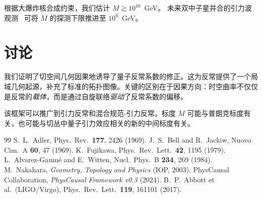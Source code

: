 \documentclass{article}
\begin{document}
根据大爆炸核合成约束，我们估计 $M \gtrsim 10^{10}$~GeV。
未来双中子星并合的引力波观测~\cite{abbott2017} 可将 $M$ 的探测下限推进至 $10^6$~GeV。

\section{讨论}

我们证明了切空间几何因果地诱导了量子反常系数的修正。这为反常提供了一个局域几何起源，补充了标准的拓扑图像。关键的区别在于因果方向：时空曲率不仅仅是反常的\emph{载体}，而是通过自旋联络\emph{驱动}了反常系数的偏移。

该框架可以推广到引力反常和混合规范-引力反常。标度 $M$ 可能与普朗克标度有关，也可能与切丛中量子引力效应相关的新的中间标度有关。

\begin{thebibliography}{99}
 S.~L.~Adler, Phys.~Rev.~{\bf 177}, 2426 (1969).
 J.~S.~Bell and R.~Jackiw, Nuovo Cim.~A {\bf 60}, 47 (1969).
 K.~Fujikawa, Phys.~Rev.~Lett.~{\bf 42}, 1195 (1979).
 L.~Alvarez-Gaum\'e and E.~Witten, Nucl.~Phys.~B {\bf 234}, 269 (1984).
 M.~Nakahara, \emph{Geometry, Topology and Physics} (IOP, 2003).
 PhysCausal Collaboration, \emph{PhysCausal Framework v0.3} (2024).
 B.~P.~Abbott et al.\ (LIGO/Virgo), Phys.~Rev.~Lett.~{\bf 119}, 161101 (2017).
\end{thebibliography}
\end{document}
